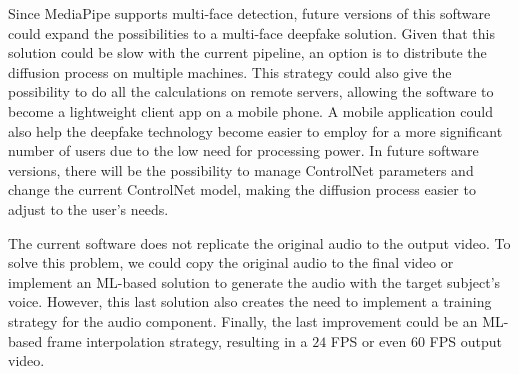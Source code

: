 \documentclass[sn-mathphys,Numbered]{sn-jnl}
\theoremstyle{thmstyleone}%
\theoremstyle{thmstyletwo}%
\theoremstyle{thmstylethree}%
\begin{document}
Since MediaPipe supports multi-face detection, future versions of this software could expand the possibilities to a multi-face deepfake solution. Given that this solution could be slow with the current pipeline, an option is to distribute the diffusion process on multiple machines. This strategy could also give the possibility to do all the calculations on remote servers, allowing the software to become a lightweight client app on a mobile phone. A mobile application could also help the deepfake technology become easier to employ for a more significant number of users due to the low need for processing power. In future software versions, there will be the possibility to manage ControlNet parameters and change the current ControlNet model, making the diffusion process easier to adjust to the user's needs.

The current software does not replicate the original audio to the output video. To solve this problem, we could copy the original audio to the final video or implement an ML-based solution to generate the audio with the target subject's voice. However, this last solution also creates the need to implement a training strategy for the audio component. Finally, the last improvement could be an ML-based frame interpolation strategy, resulting in a $24$ FPS or even $60$ FPS output video.



%  

\end{document}
